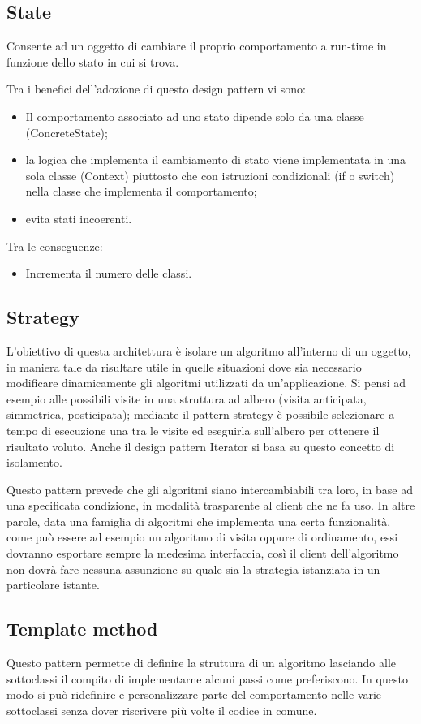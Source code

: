 \subsection{State}
Consente ad un oggetto di cambiare il proprio comportamento a run-time in funzione dello stato in cui si trova.

Tra i benefici dell'adozione di questo design pattern vi sono:
\begin{itemize}
	\item Il comportamento associato ad uno stato dipende solo da una classe (ConcreteState);
	\item la logica che implementa il cambiamento di stato viene implementata in una sola classe (Context) piuttosto che con istruzioni condizionali (if o switch) nella classe che implementa il comportamento;
	\item evita stati incoerenti.
\end{itemize}
Tra le conseguenze:
\begin{itemize}
\item Incrementa il numero delle classi.
\end{itemize}

\subsection{Strategy}
L'obiettivo di questa architettura è isolare un algoritmo all'interno di un oggetto, in maniera tale da risultare utile in quelle situazioni dove sia necessario modificare dinamicamente gli algoritmi utilizzati da un'applicazione. Si pensi ad esempio alle possibili visite in una struttura ad albero (visita anticipata, simmetrica, posticipata); mediante il pattern strategy è possibile selezionare a tempo di esecuzione una tra le visite ed eseguirla sull'albero per ottenere il risultato voluto. Anche il design pattern Iterator si basa su questo concetto di isolamento.

Questo pattern prevede che gli algoritmi siano intercambiabili tra loro, in base ad una specificata condizione, in modalità trasparente al client che ne fa uso. In altre parole, data una famiglia di algoritmi che implementa una certa funzionalità, come può essere ad esempio un algoritmo di visita oppure di ordinamento, essi dovranno esportare sempre la medesima interfaccia, così il client dell'algoritmo non dovrà fare nessuna assunzione su quale sia la strategia istanziata in un particolare istante.
\subsection{Template method}
Questo pattern permette di definire la struttura di un algoritmo lasciando alle sottoclassi il compito di implementarne alcuni passi come preferiscono. In questo modo si può ridefinire e personalizzare parte del comportamento nelle varie sottoclassi senza dover riscrivere più volte il codice in comune.

